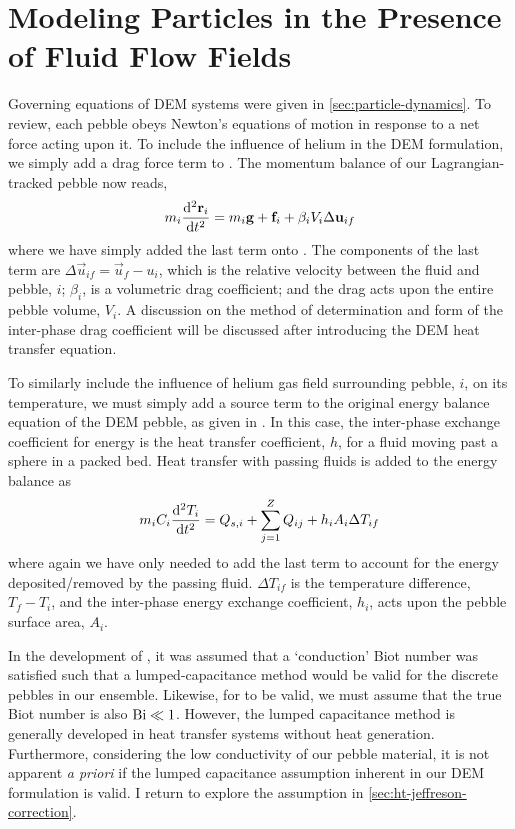 \section{Modeling Particles in the Presence of Fluid Flow Fields} \label{sec:modeling-cfd-dem}
Governing equations of DEM systems were given in \cref{sec:particle-dynamics}. To review, each pebble obeys Newton's equations of motion in response to a net force acting upon it. To include the influence of helium in the DEM formulation, we simply add a drag force term to . The momentum balance of our Lagrangian-tracked pebble now reads,
\begin{equation}\label{eq:cfdem-dem-momentum}
	m_i  \frac{\mathrm{d}^2{\mathbf{r}_i}}{\mathrm{d}t^2} = m_i\mathbf{g} + \mathbf{f}_i + \beta_i V_i \Delta \mathbf{u}_{if}
\end{equation}
where we have simply added the last term onto . The components of the last term are $\Delta \vec{u}_{if} = \vec{u}_f - u_i$, which is the relative velocity between the fluid and pebble, $i$; $\beta_i$, is a volumetric drag coefficient; and the drag acts upon the entire pebble volume, $V_i$. A discussion on the method of determination and form of the inter-phase drag coefficient will be discussed after introducing the DEM heat transfer equation.

To similarly include the influence of helium gas field surrounding pebble, $i$, on its temperature, we must simply add a source term to the original energy balance equation of the DEM pebble, as given in . In this case, the inter-phase exchange coefficient for energy is the heat transfer coefficient, $h$, for a fluid moving past a sphere in a packed bed. Heat transfer with passing fluids is added to the energy balance as
\begin{equation}\label{eq:cfdem-dem-energy}
	m_iC_i \frac{\mathrm{d}^2{T_i}}{\mathrm{d}t^2} = Q_{s,i} + \sum_{j=1}^Z Q_{ij} + h_i A_i \Delta T_{if}
\end{equation}
where again we have only needed to add the last term to account for the energy deposited/removed by the passing fluid. $\Delta T_{if}$ is the temperature difference, $T_f - T_i$, and the inter-phase energy exchange coefficient, $h_i$, acts upon the pebble surface area, $A_i$.

In the development of , it was assumed that a `conduction' Biot number was satisfied such that a lumped-capacitance method would be valid for the discrete pebbles in our ensemble. Likewise, for  to be valid, we must assume that the true Biot number is also $\mathrm{Bi} \ll 1$. However, the lumped capacitance method is generally developed in heat transfer systems without heat generation. Furthermore, considering the low conductivity of our pebble material, it is not apparent \textit{a priori} if the lumped capacitance assumption inherent in our DEM formulation is valid. I return to explore the assumption in \cref{sec:ht-jeffreson-correction}.

